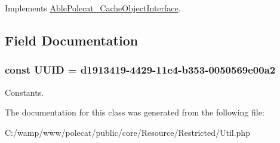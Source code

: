 Implements \hyperlink{interface_able_polecat___cache_object_interface_a3f2135f6ad45f51d075657f6d20db2cd}{Able\+Polecat\+\_\+\+Cache\+Object\+Interface}.



\subsection{Field Documentation}
\hypertarget{class_able_polecat___resource___restricted___util_a74b892c8c0b86bf9d04c5819898c51e7}{}
\subsubsection[{U\+U\+I\+D}]{\setlength{\rightskip}{0pt plus 5cm}const U\+U\+I\+D = \textquotesingle{}d1913419-\/4429-\/11e4-\/b353-\/0050569e00a2\textquotesingle{}}\label{class_able_polecat___resource___restricted___util_a74b892c8c0b86bf9d04c5819898c51e7}
Constants. 

The documentation for this class was generated from the following file\+:\begin{DoxyCompactItemize}
\item 
C\+:/wamp/www/polecat/public/core/\+Resource/\+Restricted/Util.\+php\end{DoxyCompactItemize}

